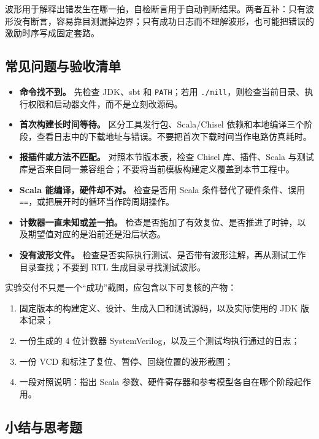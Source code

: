 波形用于解释出错发生在哪一拍，自检断言用于自动判断结果。两者互补：只有波形没有断言，容易靠目测漏掉边界；只有成功日志而不理解波形，也可能把错误的激励时序写成固定套路。

\subsection{常见问题与验收清单}

\begin{itemize}
  \item \textbf{命令找不到。} 先检查 JDK、sbt 和 \texttt{PATH}；若用 \texttt{./mill}，则检查当前目录、执行权限和启动器文件，而不是立刻改源码。
  \item \textbf{首次构建长时间等待。} 区分工具发行包、Scala/Chisel 依赖和本地编译三个阶段，查看日志中的下载地址与错误。不要把首次下载时间当作电路仿真耗时。
  \item \textbf{报插件或方法不匹配。} 对照本节版本表，检查 Chisel 库、插件、Scala 与测试库是否来自同一兼容组合；不要将当前模板构建定义覆盖到本节工程中。
  \item \textbf{Scala 能编译，硬件却不对。} 检查是否用 Scala 条件替代了硬件条件、误用 \texttt{==}，或把展开时的循环当作跨周期操作。
  \item \textbf{计数器一直未知或差一拍。} 检查是否施加了有效复位、是否推进了时钟，以及期望值对应的是沿前还是沿后状态。
  \item \textbf{没有波形文件。} 检查是否实际执行测试、是否带有波形注解，再从测试工作目录查找；不要到 RTL 生成目录寻找测试波形。
\end{itemize}

实验交付不只是一个“成功”截图，应包含以下可复核的产物：

\begin{enumerate}
  \item 固定版本的构建定义、设计、生成入口和测试源码，以及实际使用的 JDK 版本记录；
  \item 一份生成的 4 位计数器 SystemVerilog，以及三个测试均执行通过的日志；
  \item 一份 VCD 和标注了复位、暂停、回绕位置的波形截图；
  \item 一段对照说明：指出 Scala 参数、硬件寄存器和参考模型各自在哪个阶段起作用。
\end{enumerate}

\subsection{小结与思考题}

